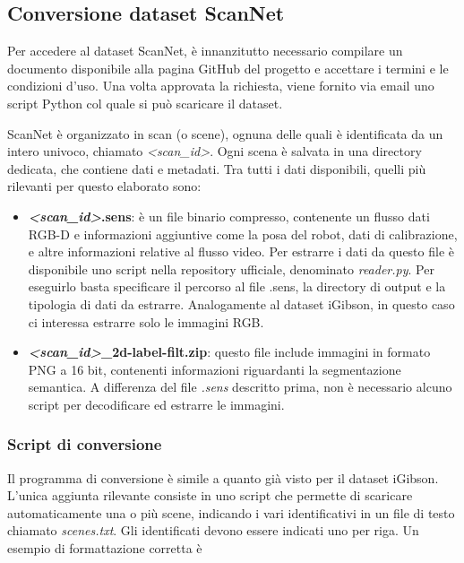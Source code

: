 \documentclass[12pt]{report}
\begin{document}
\subsection{Conversione dataset ScanNet}
\label{sec:conversione_dataset_scannet}

Per accedere al dataset ScanNet, è innanzitutto necessario compilare un documento disponibile alla pagina GitHub del progetto e accettare i termini e le condizioni d'uso. Una volta approvata la richiesta, viene fornito via email uno script Python col quale si può scaricare il dataset.

ScanNet è organizzato in scan (o scene), ognuna delle quali è identificata da un intero univoco, chiamato \textit{<scan\_id>}. Ogni scena è salvata in una directory dedicata, che contiene dati e metadati. Tra tutti i dati disponibili, quelli più rilevanti per questo elaborato sono:

\begin{itemize}
	\item \textbf{\textit{<scan\_id>}.sens}: è un file binario compresso, contenente un flusso dati RGB-D e informazioni aggiuntive come la posa del robot, dati di calibrazione, e altre informazioni relative al flusso video. Per estrarre i dati da questo file è disponibile uno script nella repository ufficiale, denominato \textit{reader.py}. Per eseguirlo basta specificare il percorso al file .sens, la directory di output e la tipologia di dati da estrarre. Analogamente al dataset iGibson, in questo caso ci interessa estrarre solo le immagini RGB.
	
	\item \textbf{\textit{<scan\_id>}\_2d-label-filt.zip}: questo file include immagini in formato PNG a 16 bit, contenenti informazioni riguardanti la segmentazione semantica. A differenza del file \textit{.sens} descritto prima, non è necessario alcuno script per decodificare ed estrarre le immagini.
\end{itemize}

\subsubsection{Script di conversione}
\label{sec:script_di_conversione_scannet}

Il programma di conversione è simile a quanto già visto per il dataset iGibson. L'unica aggiunta rilevante consiste in uno script che permette di scaricare automaticamente una o più scene, indicando i vari identificativi in un file di testo chiamato \textit{scenes.txt}. Gli identificati devono essere indicati uno per riga. Un esempio di formattazione corretta è
\end{document}
